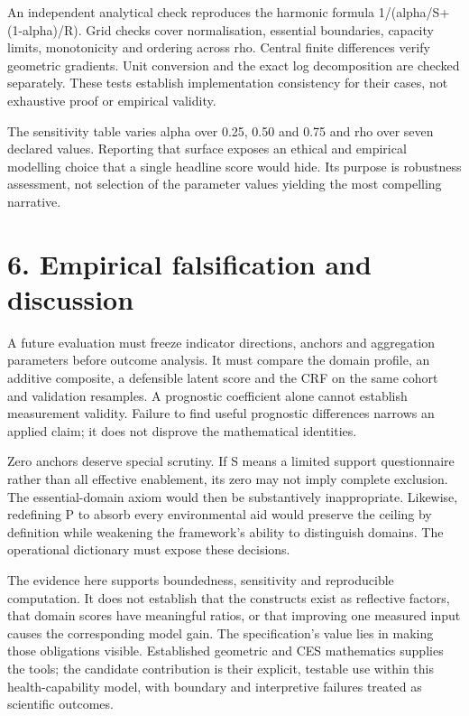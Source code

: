 \documentclass[11pt,a4paper]{article}
\begin{document}
An independent analytical check reproduces the harmonic formula 1/(alpha/S+(1-alpha)/R). Grid checks cover normalisation, essential boundaries, capacity limits, monotonicity and ordering across rho. Central finite differences verify geometric gradients. Unit conversion and the exact log decomposition are checked separately. These tests establish implementation consistency for their cases, not exhaustive proof or empirical validity.

The sensitivity table varies alpha over 0.25, 0.50 and 0.75 and rho over seven declared values. Reporting that surface exposes an ethical and empirical modelling choice that a single headline score would hide. Its purpose is robustness assessment, not selection of the parameter values yielding the most compelling narrative.

\section*{6. Empirical falsification and discussion}
A future evaluation must freeze indicator directions, anchors and aggregation parameters before outcome analysis. It must compare the domain profile, an additive composite, a defensible latent score and the CRF on the same cohort and validation resamples. A prognostic coefficient alone cannot establish measurement validity. Failure to find useful prognostic differences narrows an applied claim; it does not disprove the mathematical identities.

Zero anchors deserve special scrutiny. If S means a limited support questionnaire rather than all effective enablement, its zero may not imply complete exclusion. The essential-domain axiom would then be substantively inappropriate. Likewise, redefining P to absorb every environmental aid would preserve the ceiling by definition while weakening the framework's ability to distinguish domains. The operational dictionary must expose these decisions.

The evidence here supports boundedness, sensitivity and reproducible computation. It does not establish that the constructs exist as reflective factors, that domain scores have meaningful ratios, or that improving one measured input causes the corresponding model gain. The specification's value lies in making those obligations visible. Established geometric and CES mathematics supplies the tools; the candidate contribution is their explicit, testable use within this health-capability model, with boundary and interpretive failures treated as scientific outcomes.
\end{document}
